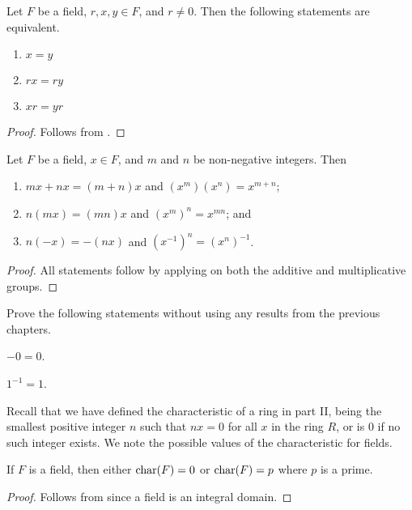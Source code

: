 \begin{proposition}
    Let $F$ be a field, $r, x, y \in F$, and $r \neq 0$. Then the following statements are equivalent.
    \begin{enumerate}
        \item $x = y$
        \item $rx = ry$
        \item $xr = yr$
    \end{enumerate}
\end{proposition}
\begin{proof}
    Follows from .
\end{proof}

\begin{proposition}
    Let $F$ be a field, $x \in F$, and $m$ and $n$ be non-negative integers. Then
    \begin{enumerate}
        \item $mx + nx = (m+n)x$ and $(x^m)(x^n) = x^{m+n}$;
        \item $n(mx) = (mn)x$ and $(x^m)^n = x^{mn}$; and
        \item $n(-x) = -(nx)$ and $(x^{-1})^n = (x^n)^{-1}$.
    \end{enumerate}
\end{proposition}
\begin{proof}
    All statements follow by applying  on both the additive and multiplicative groups.
\end{proof}

\begin{exercise}\label{exercise-inverse-of-additive-and-multiplicative-identities-are-themselves}
    Prove the following statements without using any results from the previous chapters.
    \begin{partquestions}{\alph*}
        \item $-0 = 0$.
        \item $1^{-1} = 1$.
    \end{partquestions}
\end{exercise}

Recall that we have defined the characteristic of a ring in part II, being the smallest positive integer $n$ such that $nx = 0$ for all $x$ in the ring $R$, or is 0 if no such integer exists. We note the possible values of the characteristic for fields.

\begin{proposition}
    If $F$ is a field, then either $\mathrm{char}(F) = 0$ or $\mathrm{char}(F) = p$ where $p$ is a prime.
\end{proposition}
\begin{proof}
    Follows from  since a field is an integral domain.
\end{proof}

